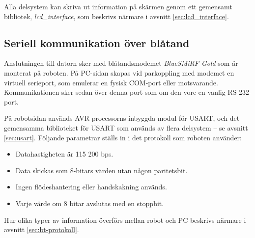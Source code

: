 Alla delsystem kan skriva ut information på skärmen genom ett gemensamt bibliotek, \textit{lcd\_interface}, som beskrivs närmare i avsnitt \ref{sec:lcd_interface}.


\subsection{Seriell kommunikation över blåtand}
Anslutningen till datorn sker med blåtandsmodemet \emph{BlueSMiRF Gold} som är monterat på roboten. På PC-sidan skapas vid parkoppling med modemet en virtuell serieport, som emulerar en fysisk COM-port eller motsvarande. Kommunikationen sker sedan över denna port som om den vore en vanlig RS-232-port. 

På robotsidan används AVR-processorns inbyggda modul för USART, och det gemensamma biblioteket för USART som används av flera delsystem -- se avsnitt \ref{sec:usart}. Följande parametrar ställs in i det protokoll som roboten använder:
\begin{itemize}
\item Datahastigheten är 115 200 bps.
\item Data skickas som 8-bitars värden utan någon paritetsbit.
\item Ingen flödeshantering eller handskakning används.
\item Varje värde om 8 bitar avslutas med en stoppbit.
\end{itemize}

Hur olika typer av information överförs mellan robot och PC beskrivs närmare i avsnitt \ref{sec:bt-protokoll}.
